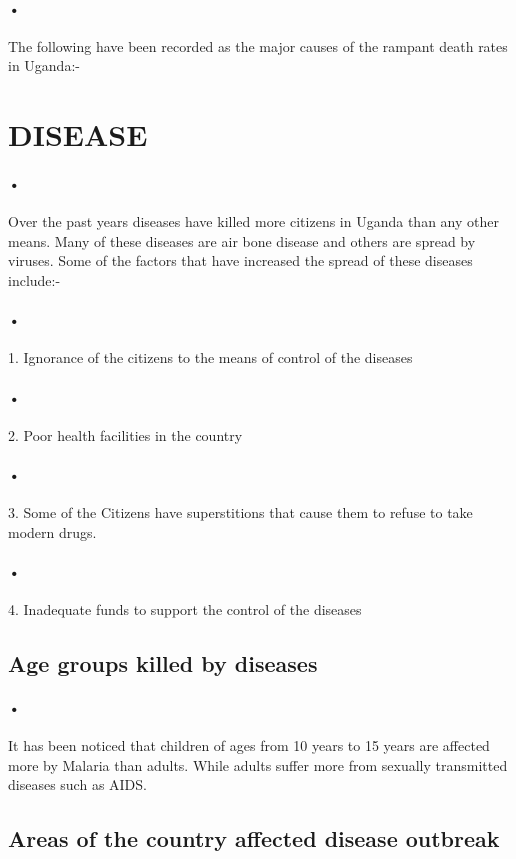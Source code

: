 \documentclass[12pt]{article}
\begin{document}
\paragraph{•}The following have been recorded as the major causes of the rampant death rates in Uganda:-

\section{DISEASE}
\paragraph{•}Over the past years diseases have killed more citizens in Uganda than any other means. Many of these diseases are air bone disease and others are spread by viruses. Some of the factors that have increased the spread of these diseases include:-
\paragraph{•}1.	Ignorance of the citizens to the means of control of the diseases
\paragraph{•}2.	Poor health facilities in the country
\paragraph{•}3.	Some of the Citizens have superstitions that cause them to refuse to take modern drugs.
\paragraph{•}4.	Inadequate funds to support the control of the diseases
\subsection{Age groups killed by diseases}
\paragraph{•}It has been noticed that children of ages from 10 years to 15 years are affected more by Malaria than adults. While adults suffer more from sexually transmitted diseases such as AIDS.
\subsection{Areas of the country affected disease outbreak}
\end{document}
